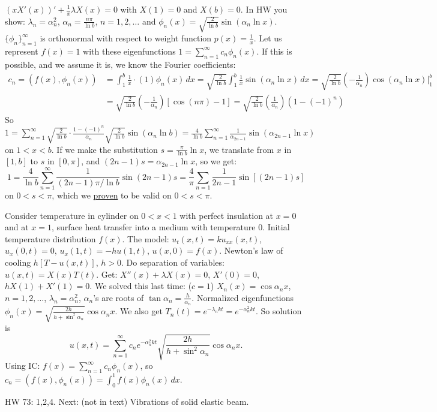 \documentclass[]{article}
\begin{document}
\begin{example}
	[Done in HW] $(x X'(x))' + \frac{1}{x} \lambda X(x) = 0$ with $X(1) = 0$ and $X(b) = 0$. In HW you show: $\lambda_n = \alpha_n^2$, $\alpha_n = \frac{n\pi}{\ln{b}}$, $n=1,2,\dots$ and $\phi_n(x) = \sqrt{\frac{2}{\ln{b}}}\sin{(\alpha_n \ln{x})}$. $\{\phi_n\}_{n=1}^\infty$ is orthonormal with respect to weight function $p(x) = \frac{1}{x}$. Let us represent $f(x) = 1$ with these eigenfunctions $1 = \sum_{n=1}^\infty c_n \phi_n(x)$. If this is possible, and we assume it is, we know the Fourier coefficients: \begin{align*} c_n = (f(x),\phi_n(x)) &= \int_1^b \frac{1}{x}\cdot(1) \phi_n(x) \, dx = \sqrt{\frac{2}{\ln{b}}} \int_1^b \frac{1}{x} \sin{(\alpha_n \ln{x})} \, dx = \sqrt{\frac{2}{\ln{b}}} \left( -\frac{1}{\alpha_n} \right) \cos{(\alpha_n \ln{x} )} \bigg\rvert_1^b \\ &= \sqrt{ \frac{2}{\ln{b}}} \left(-\frac{1}{\alpha_n} \right) [\cos{(n\pi)}-1] = \sqrt{ \frac{2}{\ln{b}}} \left( \frac{1}{\alpha_n} \right) (1-(-1)^n) \end{align*}
	So $ \displaystyle 1 = \sum_{n=1}^\infty \sqrt{ \frac{2}{\ln{b}}} \cdot \frac{1-(-1)^n}{\alpha_n} \sqrt{ \frac{2}{\ln{b}}} \sin{( \alpha_n \ln{b})} = \frac{4}{\ln{b}} \sum_{n=1}^\infty \frac{1}{\alpha_{2n-1}} \sin{(\alpha_{2n-1} \ln{x})}$ on $1<x<b$.
	If we make the substitution $s = \frac{\pi}{\ln{b}}\ln{x}$, we translate from $x$ in $[1,b]$ to $s$ in $[0,\pi]$, and $(2n-1)s = \alpha_{2n-1} \ln{x}$, so we get: $$ 1 = \frac{4}{\ln{b}} \sum_{n=1}^\infty \frac{1}{(2n-1)\pi/\ln{b}} \sin{(2n-1)s} = \frac{4}{\pi} \sum_{n=1} \frac{1}{2n-1} \sin{[(2n-1)s]} $$ on $0 < s < \pi$, which we \underline{proven} to be valid on $0<s<\pi$.
\end{example}
\begin{example}
	Consider temperature in cylinder on $0<x<1$ with perfect insulation at $x = 0$ and at $x=1$, surface heat transfer into a medium with temperature 0. Initial temperature distribution $f(x)$. The model: $u_t(x,t) = ku_{xx}(x,t)$, $u_x(0,t) = 0$, $u_x(1,t) = -hu(1,t)$, $u(x,0) = f(x)$. Newton's law of cooling $h[T-u(x,t)]$, $h>0$. Do separation of variables: $u(x,t) = X(x) T(t)$. Get: $X''(x) + \lambda X(x) = 0$, $X'(0) = 0$, $hX(1) + X'(1) = 0$. We solved this last time: ($c = 1$) $X_n(x) = \cos{\alpha_n x}$, $n=1,2,\dots$, $\lambda_n = \alpha_n^2$, $\alpha_n$'s are roots of $\tan{\alpha_n} = \frac{h}{\alpha_n}$. Normalized eigenfunctions $\phi_n(x) = \sqrt{ \frac{2h}{h + \sin^2{\alpha_n}}} \cos{\alpha_n x}$. We also get $T_n(t) = e^{-\lambda_n kt} = e^{-\alpha_n^2 kt}$. So solution is $$ u(x,t) = \sum_{n=1}^\infty c_n e^{-\alpha_n^2 kt} \sqrt{ \frac{2h}{h + \sin^2{\alpha_n}}} \cos{\alpha_n x}.$$ Using IC: $f(x) = \sum_{n=1}^\infty c_n \phi_n(x)$, so $c_n = (f(x),\phi_n(x)) = \int_0^1 f(x) \phi_n(x) \, dx$.
\end{example}
HW 73: 1,2,4.
Next: (not in text) Vibrations of solid elastic beam.
\end{document}
